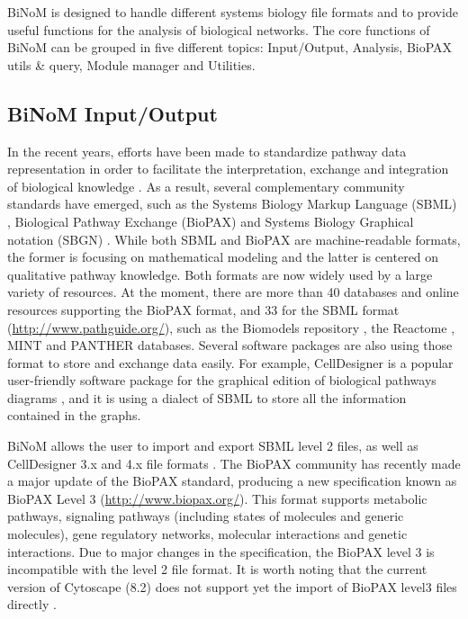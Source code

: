 \documentclass[10pt]{bmc_article}
\newenvironment{bmcformat}{\baselineskip20pt\sloppy\setboolean{publ}{false}}{\baselineskip20pt\sloppy}
\begin{document}
\begin{bmcformat}
%
%

BiNoM is designed to handle different systems biology file formats and to
provide useful functions for the analysis of biological networks. The core
functions of BiNoM can be grouped in five different topics: Input/Output,
Analysis, BioPAX utils \& query, Module manager and Utilities.


\subsection*{BiNoM Input/Output}
In the recent years, efforts have been made to standardize pathway data
representation in order to facilitate the interpretation, exchange and
integration of biological knowledge \cite{klipp2007systems}. As a result,
several complementary community standards have emerged, such as the Systems
Biology Markup Language (SBML) \cite{hucka2003systems}, Biological Pathway
Exchange (BioPAX) \cite{demir2010biopax} and Systems Biology Graphical notation
(SBGN) \cite{le2009systems}. While both SBML and BioPAX are machine-readable
formats, the former is focusing on mathematical modeling and the latter is
centered on qualitative pathway knowledge. Both formats are now widely used by a
large variety of resources. At the moment, there are more than 40 databases and
online resources supporting the BioPAX format, and 33 for the SBML format
(\url{http://www.pathguide.org/}), such as the Biomodels repository
\cite{le2006biomodels}, the Reactome  \cite{joshi2005reactome}, MINT
\cite{zanzoni2002mint} and PANTHER \cite{mi2010panther} databases. 
Several software packages are also using those format to store and exchange data
easily. For example, CellDesigner is a popular user-friendly software package
for the graphical edition of biological pathways diagrams
\cite{funahashi2003celldesigner}, and it is using a dialect
of SBML to store all the information contained in the graphs.

BiNoM allows the user to import and export SBML level 2 files, as well as
CellDesigner 3.x and 4.x file formats \cite{zinovyev2008binom}. The BioPAX
community has recently made a major update of the BioPAX standard, producing a
new specification known as BioPAX Level 3 (\url{http://www.biopax.org/}). This
format
supports metabolic pathways, signaling pathways (including states of molecules
and generic molecules), gene regulatory networks, molecular interactions and
genetic interactions. Due to major changes in the
specification, the BioPAX level 3 is incompatible with the level 2 file format.
It is worth noting that the current version of Cytoscape (8.2) does not support
yet the import of BioPAX level3 files directly \cite{demir2010biopax}.


\end{bmcformat}
\end{document}
